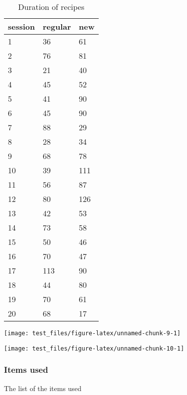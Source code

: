 \documentclass[]{article}
\begin{document}
\begin{table}

\caption{\label{tab:unnamed-chunk-8}Duration of recipes}
\centering
\begin{tabular}[t]{l|l|l}
\hline
session & regular & new\\
\hline
\rowcolor{gray!6}  1 & 36 & 61\\
\hline
2 & 76 & 81\\
\hline
\rowcolor{gray!6}  3 & 21 & 40\\
\hline
4 & 45 & 52\\
\hline
\rowcolor{gray!6}  5 & 41 & 90\\
\hline
6 & 45 & 90\\
\hline
\rowcolor{gray!6}  7 & 88 & 29\\
\hline
8 & 28 & 34\\
\hline
\rowcolor{gray!6}  9 & 68 & 78\\
\hline
10 & 39 & 111\\
\hline
\rowcolor{gray!6}  11 & 56 & 87\\
\hline
12 & 80 & 126\\
\hline
\rowcolor{gray!6}  13 & 42 & 53\\
\hline
14 & 73 & 58\\
\hline
\rowcolor{gray!6}  15 & 50 & 46\\
\hline
16 & 70 & 47\\
\hline
\rowcolor{gray!6}  17 & 113 & 90\\
\hline
18 & 44 & 80\\
\hline
\rowcolor{gray!6}  19 & 70 & 61\\
\hline
20 & 68 & 17\\
\hline
\end{tabular}
\end{table}

\begin{center}\texttt{[image: test\_files/figure-latex/unnamed-chunk-9-1]} \end{center}

\begin{center}\texttt{[image: test\_files/figure-latex/unnamed-chunk-10-1]} \end{center}

\subsubsection{Items used}\label{items-used}

The list of the items used
\end{document}
